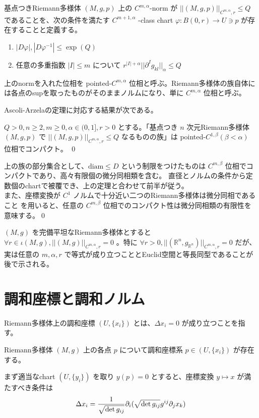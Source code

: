 \documentclass[dvipdfmx,a4paper]{jsarticle}
\theoremstyle{definition}
\newcommand{\der}{\partial}
\renewcommand{\phi}{\varphi}
\newcommand{\R}{\mathbb{R}}
\begin{document}
基点つきRiemann多様体 $(M,g,p)$ 上の $C^{m,\alpha}$-norm が $||(M,g,p)||_{C^{m,\alpha},r} \leq Q$ であることを、次の条件を満たす $C^{m+1,\alpha}$ -class chart $\phi:B(0,r) \to U \ni p$ が存在することと定義する。 
\begin{enumerate}
    \item $|D\phi|,|D\phi^{-1}| \leq \exp(Q)$
    \item 任意の多重指数 $|I| \leq m$ について $r^{|I|+\alpha}||\der^{I}g_{kl}||_{\alpha} \leq Q$
\end{enumerate}

上のnormを入れた位相を pointed-$C^{m,\alpha}$ 位相と呼ぶ。Riemann多様体の族自体には各点のsupを取ったものがそのままノルムになり、単に $C^{m,\alpha}$ 位相と呼ぶ。

Ascoli-Arzelaの定理に対応する結果が次である。

\thm\label{cpt} $Q>0,n \geq 2,m \geq 0,\alpha \in (0,1],r>0$ とする。「基点つき $n$ 次元Riemann多様体 $(M,g,p)$ で $||(M,g,p)||_{C^{m,\alpha},r} \leq Q$ なるものの族」は pointed-$C^{1,\beta} (\beta<\alpha)$ 位相でコンパクト。 \qed

\cor 上の族の部分集合として、$\mbox{diam} \leq D$ という制限をつけたものは $C^{m,\beta}$ 位相でコンパクトであり、高々有限個の微分同相類を含む。
\prf 直径とノルムの条件から定数個のchartで被覆でき、上の定理と合わせて前半が従う。\\
また、座標変換が $C^1$ ノルムで十分近い二つのRiemann多様体は微分同相であること \cite[Theorem 2.1.6]{hirsch} を用いると、任意の $C^{m,\beta}$ 位相でのコンパクト性は微分同相類の有限性を意味する。\qed

\eg $(M,g)$ を完備平坦なRiemann多様体とすると $\forall r \in \iota(M,g),||(M,g)||_{C^{m,\alpha},r}=0$ 。特に $\forall r>0, ||(\R^n,g_{\R^n})||_{C^{m,\alpha},r}=0$ だが、実は任意の $m,\alpha,r$ で等式が成り立つこととEuclid空間と等長同型であることが後で示される。

\section{調和座標と調和ノルム}
Riemann多様体上の調和座標 $(U,\{x_i\})$ とは、$\Delta x_i=0$ が成り立つことを指す。

\prop Riemann多様体 $(M,g)$ 上の各点 $p$ について調和座標系 $p \in (U,\{x_i\})$ が存在する。

\prf まず適当なchart $(U,\{y_i\})$ を取り $y(p)=0$ とすると、座標変換 $y \mapsto x$ が満たすべき条件は
\begin{align*}
    \Delta x_i={1 \over \sqrt{\det g_{ij}}}\der_i(\sqrt{\det g_{ij}}g^{ij}\der_jx_k)
\end{align*}
\end{document}
